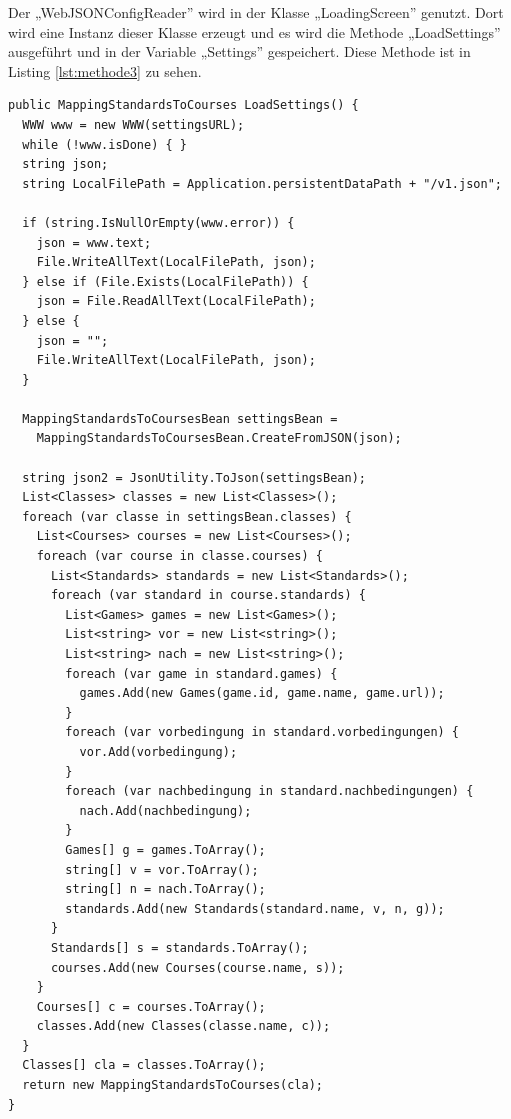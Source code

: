 				Der „WebJSONConfigReader” wird in der Klasse „LoadingScreen” genutzt. Dort wird eine Instanz dieser Klasse erzeugt und es wird die Methode „LoadSettings” ausgeführt und in der Variable „Settings” gespeichert. Diese Methode ist in Listing \ref{lst:methode3} zu sehen.

			\begin{scriptsize}
				\lstset{
					float,
					caption=Methode LoadSettings, 
					language=[Sharp]C, 
					frame=single,  
					showstringspaces=false, 
					showspaces=false, 
					numbers=left, 
					captionpos=b, 
					belowcaptionskip=4pt,
					basicstyle=\ttfamily
				} 
				\begin{lstlisting}[label=lst:methode3]
public MappingStandardsToCourses LoadSettings() {
  WWW www = new WWW(settingsURL);
  while (!www.isDone) { }
  string json;
  string LocalFilePath = Application.persistentDataPath + "/v1.json";
	
  if (string.IsNullOrEmpty(www.error)) {
    json = www.text;
    File.WriteAllText(LocalFilePath, json);
  } else if (File.Exists(LocalFilePath)) {
    json = File.ReadAllText(LocalFilePath);
  } else {
    json = "";                
    File.WriteAllText(LocalFilePath, json);
  }

  MappingStandardsToCoursesBean settingsBean = 
    MappingStandardsToCoursesBean.CreateFromJSON(json);
  
  string json2 = JsonUtility.ToJson(settingsBean);	
  List<Classes> classes = new List<Classes>();
  foreach (var classe in settingsBean.classes) {
    List<Courses> courses = new List<Courses>();
    foreach (var course in classe.courses) {
      List<Standards> standards = new List<Standards>();
      foreach (var standard in course.standards) {
        List<Games> games = new List<Games>();
        List<string> vor = new List<string>();
        List<string> nach = new List<string>();
        foreach (var game in standard.games) {
          games.Add(new Games(game.id, game.name, game.url));
        }
        foreach (var vorbedingung in standard.vorbedingungen) {
          vor.Add(vorbedingung);
        }
        foreach (var nachbedingung in standard.nachbedingungen) {
          nach.Add(nachbedingung);
        }
        Games[] g = games.ToArray();
        string[] v = vor.ToArray();
        string[] n = nach.ToArray();
        standards.Add(new Standards(standard.name, v, n, g));
      }
      Standards[] s = standards.ToArray();
      courses.Add(new Courses(course.name, s));
    }
    Courses[] c = courses.ToArray();
    classes.Add(new Classes(classe.name, c));
  }
  Classes[] cla = classes.ToArray();
  return new MappingStandardsToCourses(cla);
}
				\end{lstlisting}
			\end{scriptsize}

